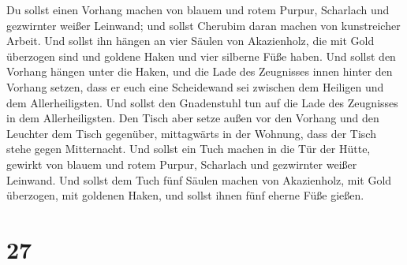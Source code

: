  Du sollst einen Vorhang machen von blauem und rotem
Purpur, Scharlach und gezwirnter weißer Leinwand; und sollst Cherubim
daran machen von kunstreicher Arbeit.  Und sollst ihn
hängen an vier Säulen von Akazienholz, die mit Gold überzogen sind und
goldene Haken und vier silberne Füße haben.  Und sollst
den Vorhang hängen unter die Haken, und die Lade des Zeugnisses innen
hinter den Vorhang setzen, dass er euch eine Scheidewand sei zwischen
dem Heiligen und dem Allerheiligsten.  Und sollst den
Gnadenstuhl tun auf die Lade des Zeugnisses in dem Allerheiligsten.
 Den Tisch aber setze außen vor den Vorhang und den
Leuchter dem Tisch gegenüber, mittagwärts in der Wohnung, dass der Tisch
stehe gegen Mitternacht.  Und sollst ein Tuch machen in
die Tür der Hütte, gewirkt von blauem und rotem Purpur, Scharlach und
gezwirnter weißer Leinwand.  Und sollst dem Tuch fünf
Säulen machen von Akazienholz, mit Gold überzogen, mit goldenen Haken,
und sollst ihnen fünf eherne Füße gießen.

\hypertarget{section-26}{%
\section{27}\label{section-26}}

